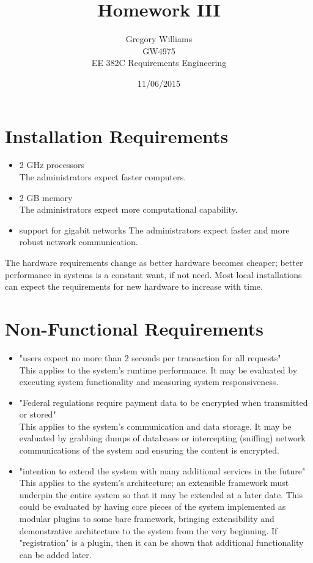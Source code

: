 \documentclass{article}
\title{Homework III}
\author{Gregory Williams\\GW4975\\EE 382C Requirements Engineering}
\date{11/06/2015}
\begin{document}
	\maketitle
	
	\section*{Installation Requirements}
	\begin{itemize}
	\item 2 GHz processors\\
		The administrators expect faster computers.\\
	\item 2 GB memory\\
		The administrators expect more computational capability.\\
	\item support for gigabit networks
		The administrators expect faster and more robust network communication.\\
	\end{itemize}
	The hardware requirements change as better hardware becomes cheaper; better performance in systems is a constant want, if not need. Most local installations can expect the requirements for new hardware to increase with time.
	\section*{Non-Functional Requirements}
	\begin{itemize}
	\item "users expect no more than 2 seconds per transaction for all requests"\\
		This applies to the system's runtime performance. It may be evaluated by executing system functionality and measuring system responsiveness.\\
	\item "Federal regulations require payment data to be encrypted when transmitted or stored"\\
		This applies to the system's communication and data storage. It may be evaluated by grabbing dumps of databases or intercepting (sniffing) network communications of the system and ensuring the content is encrypted.\\
	\item "intention to extend the system with many additional services in the future"
		This applies to the system's architecture; an extensible framework must underpin the entire system so that it may be extended at a later date. This could be evaluated by having core pieces of the system implemented as modular plugins to some bare framework, bringing extensibility and demonstrative architecture to the system from the very beginning. If "registration" is a plugin, then it can be shown that additional functionality can be added later.\\
	\end{itemize}
\end{document}
